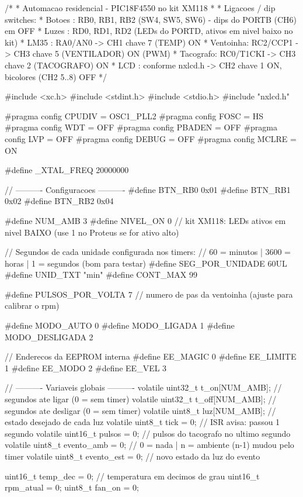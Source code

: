 /*
 * Automacao residencial - PIC18F4550 no kit XM118
 *
 * Ligacoes / dip switches:
 *   Botoes   : RB0, RB1, RB2 (SW4, SW5, SW6) - dips do PORTB (CH6) em OFF
 *   Luzes    : RD0, RD1, RD2 (LEDs do PORTD, ativos em nivel baixo no kit)
 *   LM35     : RA0/AN0   -> CH1 chave 7 (TEMP) ON
 *   Ventoinha: RC2/CCP1  -> CH3 chave 5 (VENTILADOR) ON (PWM)
 *   Tacografo: RC0/T1CKI -> CH3 chave 2 (TACOGRAFO) ON
 *   LCD      : conforme nxlcd.h -> CH2 chave 1 ON, bicolores (CH2 5..8) OFF
 */

#include <xc.h>
#include <stdint.h>
#include <stdio.h>
#include "nxlcd.h"

#pragma config CPUDIV = OSC1_PLL2
#pragma config FOSC = HS
#pragma config WDT = OFF
#pragma config PBADEN = OFF
#pragma config LVP = OFF
#pragma config DEBUG = OFF
#pragma config MCLRE = ON

#define _XTAL_FREQ 20000000

// ---------- Configuracoes ----------
#define BTN_RB0  0x01
#define BTN_RB1  0x02
#define BTN_RB2  0x04

#define NUM_AMB          3
#define NIVEL_ON         0      // kit XM118: LEDs ativos em nivel BAIXO (use 1 no Proteus se for ativo alto)

// Segundos de cada unidade configurada nos timers:
// 60 = minutos | 3600 = horas | 1 = segundos (bom para testar)
#define SEG_POR_UNIDADE  60UL
#define UNID_TXT         "min"
#define CONT_MAX         99

#define PULSOS_POR_VOLTA 7      // numero de pas da ventoinha (ajuste para calibrar o rpm)

#define MODO_AUTO        0
#define MODO_LIGADA      1
#define MODO_DESLIGADA   2

// Enderecos da EEPROM interna
#define EE_MAGIC   0
#define EE_LIMITE  1
#define EE_MODO    2
#define EE_VEL     3

// ---------- Variaveis globais ----------
volatile uint32_t t_on[NUM_AMB];     // segundos ate ligar  (0 = sem timer)
volatile uint32_t t_off[NUM_AMB];    // segundos ate desligar (0 = sem timer)
volatile uint8_t  luz[NUM_AMB];      // estado desejado de cada luz
volatile uint8_t  tick = 0;          // ISR avisa: passou 1 segundo
volatile uint16_t pulsos = 0;        // pulsos do tacografo no ultimo segundo
volatile uint8_t  evento_amb = 0;    // 0 = nada | n = ambiente (n-1) mudou pelo timer
volatile uint8_t  evento_est = 0;    // novo estado da luz do evento

uint16_t temp_dec = 0;               // temperatura em decimos de grau
uint16_t rpm_atual = 0;
uint8_t  fan_on = 0;

